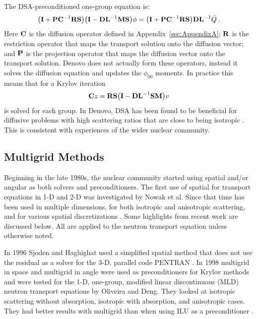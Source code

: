 The DSA-preconditioned one-group equation is:
%
\begin{equation}
  \bigl(\mathbf{I} + \mathbf{PC}^{-1}\mathbf{RS}\bigr) \bigl(\mathbf{I} - \mathbf{DL}^{-1}\mathbf{MS}\bigr) \phi = \bigl(\mathbf{I} + \mathbf{PC}^{-1}\mathbf{RS}\bigr)\mathbf{DL}^{-1}\bar{Q} \:. 
  \label{DSA1group}
\end{equation}
%
Here $\mathbf{C}$ is the diffusion operator defined in Appendix~\ref{sec:AppendixA}; $\mathbf{R}$ is the restriction operator that maps the transport solution onto the diffusion vector; and $\mathbf{P}$ is the projection operator that maps the diffusion vector onto the transport solution. Denovo does not actually form these operators, instead it solves the diffusion equation and updates the $\phi_{00}$ moments. In practice this means that for a Krylov iteration
%
\begin{equation}
  \mathbf{C}z = \mathbf{RS}\bigl(\mathbf{I} - \mathbf{DL}^{-1}\mathbf{SM}\bigr) v
\end{equation}
%
is solved for each group. In Denovo, DSA has been found to be beneficial for diffusive problems with high scattering ratios that are close to being isotropic \cite{Evans2009d}. This is consistent with experiences of the wider nuclear community.

\subsection{Multigrid Methods}
Beginning in the late 1980s, the nuclear community started using spatial \mg and/or angular \mg as both solvers and preconditioners. The first use of spatial \mg for transport equations in 1-D and 2-D was investigated by Nowak et al. Since that time \mg has been used in multiple dimensions, for both isotropic and anisotropic scattering, and for various spatial discretizations \cite{Adams2002}. Some highlights from recent work are discussed below. All are applied to the \Sn neutron transport equation unless otherwise noted. 

In 1996 Sjoden and Haghighat used a simplified spatial \mg method that does not use the residual as a solver for the 3-D, parallel code PENTRAN \cite{Sjoden1996}. In 1998 multigrid in space and multigrid in angle were used as preconditioners for Krylov methods and were tested for the 1-D, one-group, modified linear discontinuous (MLD) neutron transport equations by Oliveira and Deng. They looked at isotropic scattering without absorption, isotropic with absorption, and anisotropic cases. They had better results with multigrid than when using ILU as a preconditioner \cite{Oliveira1998}.

